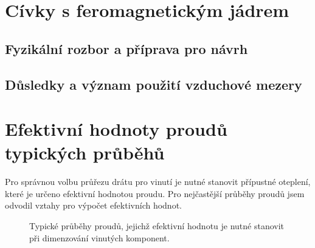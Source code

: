   \section{Cívky s feromagnetickým jádrem}
    \subsection{Fyzikální rozbor a příprava pro návrh}
    \subsection{Důsledky a význam použití vzduchové mezery}
    
  \newpage
  \section{Efektivní hodnoty proudů typických prů\-bě\-hů}
    Pro správnou volbu průřezu drátu pro vinutí je nutné stanovit přípustné oteplení, které je určeno 
    efektivní hodnotou proudu. Pro nejčastější průběhy proudů jsem odvodil vztahy pro výpočet efektivních 
    hodnot.
    \begin{figure}[b]
      \centering
      \caption{Typické průběhy proudů, jejichž efektivní hodnotu je nutné stanovit při dimenzování
               vinutých komponent.}
      \label{es:fig_Ief_solve1}
    \end{figure}

